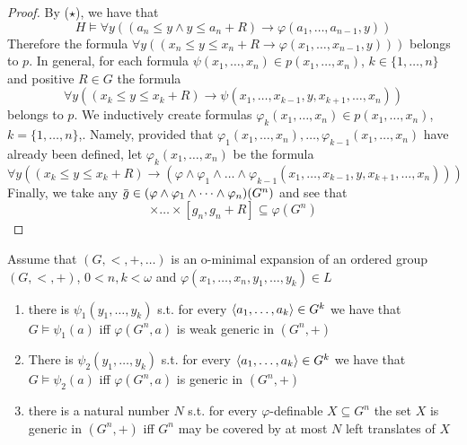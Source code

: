 \documentclass[11pt]{article}
\begin{document}
\begin{proof}
By (\(\star\)), we have that
\begin{equation*}
H\vDash\forall y((a_n\le y\wedge y\le a_n+R)\to\varphi(a_1,\dots,a_{n-1},y))
\end{equation*}
Therefore the formula \(\forall y((x_n\le y\le x_n+R\to\varphi(x_1,\dots,x_{n-1},y)))\) belongs to \(p\). In general,
for each formula \(\psi(x_1,\dots,x_n)\in p(x_1,\dots,x_n)\), \(k\in\{1,\dots,n\}\) and positive \(R\in G\) the formula
\begin{equation*}
\forall y((x_k\le y\le x_k+R)\to\psi(x_1,\dots,x_{k-1},y,x_{k+1},\dots,x_n))
\end{equation*}
belongs to \(p\). We inductively create formulas \(\varphi_k(x_1,\dots,x_n)\in p(x_1,\dots,x_n)\), \(k=\{1,\dots,n\}\),.
Namely, provided that \(\varphi_1(x_1,\dots,x_n),\dots,\varphi_{k-1}(x_1,\dots,x_n)\) have already been defined,
let \(\varphi_k(x_1,\dots,x_n)\) be the formula
\begin{equation*}
\forall y((x_k\le y\le x_k+R)\to(\varphi\wedge\varphi_1\wedge\dots\wedge\varphi_{k-1}(x_1,\dots,x_{k-1},y,x_{k+1},\dots,x_n)))
\end{equation*}
Finally, we take any \(\barg\in(\varphi\wedge\varphi_1\wedge\dots\wedge\varphi_n)(G^n)\) and see that
\begin{equation*}
[g_1,g_1+R]\times\dots\times[g_n,g_n+R]\subseteq\varphi(G^n)
\end{equation*}
\end{proof}

\begin{corollary}[]
Assume that \((G,<,+,\dots)\) is an o-minimal expansion of an ordered group \((G,<,+)\), \(0<n,k<\omega\)
and \(\varphi(x_1,\dots,x_n,y_1,\dots,y_k)\in L\)
\begin{enumerate}
\item there is \(\psi_1(y_1,\dots,y_k)\) s.t. for every \(\langle a_1,\dots,a_k\rangle\in G^k\) we have that \(G\vDash\psi_1(a)\)
iff \(\varphi(G^n,a)\) is weak generic in \((G^n,+)\)
\item There is \(\psi_2(y_1,\dots,y_k)\) s.t. for every \(\langle a_1,\dots,a_k\rangle\in G^k\) we have that \(G\vDash\psi_2(a)\)
iff \(\varphi(G^n,a)\) is generic in \((G^n,+)\)
\item there is a natural number \(N\) s.t. for every \(\varphi\)-definable \(X\subseteq G^n\) the set \(X\) is generic
in \((G^n,+)\) iff \(G^n\) may be covered by at most \(N\) left translates of \(X\)
\end{enumerate}
\end{corollary}
\end{document}
